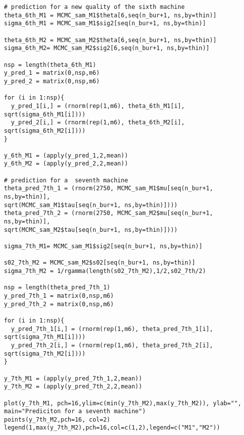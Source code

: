 \documentclass[a4paper, 11pt]{article}
\begin{document}
\begin{verbatim}
# prediction for a new quality of the sixth machine
theta_6th_M1 = MCMC_sam_M1$theta[6,seq(n_bur+1, ns,by=thin)]
sigma_6th_M1 = MCMC_sam_M1$sig2[seq(n_bur+1, ns,by=thin)]

theta_6th_M2 = MCMC_sam_M2$theta[6,seq(n_bur+1, ns,by=thin)]
sigma_6th_M2= MCMC_sam_M2$sig2[6,seq(n_bur+1, ns,by=thin)]

nsp = length(theta_6th_M1)
y_pred_1 = matrix(0,nsp,m6)
y_pred_2 = matrix(0,nsp,m6)

for (i in 1:nsp){
  y_pred_1[i,] = (rnorm(rep(1,m6), theta_6th_M1[i], sqrt(sigma_6th_M1[i])))
  y_pred_2[i,] = (rnorm(rep(1,m6), theta_6th_M2[i], sqrt(sigma_6th_M2[i])))
}

y_6th_M1 = (apply(y_pred_1,2,mean))
y_6th_M2 = (apply(y_pred_2,2,mean))

# prediction for a  seventh machine
theta_pred_7th_1 = (rnorm(2750, MCMC_sam_M1$mu[seq(n_bur+1, ns,by=thin)],
sqrt(MCMC_sam_M1$tau[seq(n_bur+1, ns,by=thin)])))
theta_pred_7th_2 = (rnorm(2750, MCMC_sam_M2$mu[seq(n_bur+1, ns,by=thin)],
sqrt(MCMC_sam_M2$tau[seq(n_bur+1, ns,by=thin)])))

sigma_7th_M1= MCMC_sam_M1$sig2[seq(n_bur+1, ns,by=thin)]

s02_7th_M2 = MCMC_sam_M2$s02[seq(n_bur+1, ns,by=thin)]
sigma_7th_M2 = 1/rgamma(length(s02_7th_M2),1/2,s02_7th/2)

nsp = length(theta_pred_7th_1)
y_pred_7th_1 = matrix(0,nsp,m6)
y_pred_7th_2 = matrix(0,nsp,m6)

for (i in 1:nsp){
  y_pred_7th_1[i,] = (rnorm(rep(1,m6), theta_pred_7th_1[i], sqrt(sigma_7th_M1[i])))
  y_pred_7th_2[i,] = (rnorm(rep(1,m6), theta_pred_7th_2[i], sqrt(sigma_7th_M2[i])))
}

y_7th_M1 = (apply(y_pred_7th_1,2,mean))
y_7th_M2 = (apply(y_pred_7th_2,2,mean))

plot(y_7th_M1, pch=16,ylim=c(min(y_7th_M2),max(y_7th_M2)), ylab="", 
main="Prediciton for a seventh machine")
points(y_7th_M2,pch=16, col=2)
legend(1,max(y_7th_M2),pch=16,col=c(1,2),legend=c("M1","M2"))


\end{verbatim}
\end{document}
